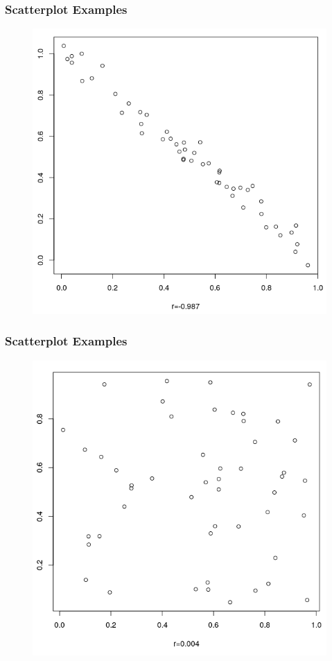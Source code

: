 \documentclass[xcolor=dvipsnames]{beamer}
\begin{document}
\begin{frame}
  \frametitle{Scatterplot Examples}
  \begin{figure}[h]
    \includegraphics[scale=0.35]{./diagrams/sc02.png}
  \end{figure}
\end{frame}

\begin{frame}
  \frametitle{Scatterplot Examples}
  \begin{figure}[h]
    \includegraphics[scale=0.35]{./diagrams/sc03.png}
  \end{figure}
\end{frame}
\end{document}
